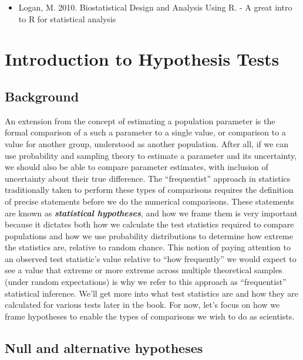\documentclass[]{book}
\providecommand{\tightlist}{%
  \setlength{\itemsep}{0pt}\setlength{\parskip}{0pt}}
\begin{document}
\begin{itemize}
\tightlist
\item
  Logan, M. 2010. Biostatistical Design and Analysis Using R. - A great intro to R for statistical analysis
\end{itemize}

\hypertarget{introduction-to-hypothesis-tests}{%
\chapter{Introduction to Hypothesis Tests}\label{introduction-to-hypothesis-tests}}

\hypertarget{background-5}{%
\section{Background}\label{background-5}}

An extension from the concept of estimating a population parameter is the formal comparison of a such a parameter to a single value, or comparison to a value for another group, understood as another population. After all, if we can use probability and sampling theory to estimate a parameter and its uncertainty, we should also be able to compare parameter estimates, with inclusion of uncertainty about their true difference. The ``frequentist'' approach in statistics traditionally taken to perform these types of comparisons requires the definition of precise statements before we do the numerical comparisons. These statements are known as \textbf{\emph{statistical hypotheses}}, and how we frame them is very important because it dictates both how we calculate the test statistics required to compare populations and how we use probability distributions to determine how extreme the statistics are, relative to random chance. This notion of paying attention to an observed test statistic's value relative to ``how frequently'' we would expect to see a value that extreme or more extreme across multiple theoretical samples (under random expectations) is why we refer to this approach as ``frequentist'' statistical inference. We'll get more into what test statistics are and how they are calculated for various tests later in the book. For now, let's focus on how we frame hypotheses to enable the types of comparisons we wish to do as scientists.

\hypertarget{null-and-alternative-hypotheses}{%
\section{Null and alternative hypotheses}\label{null-and-alternative-hypotheses}}
\end{document}
